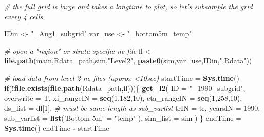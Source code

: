 \documentclass[
]{article}
\newenvironment{Shaded}{\begin{snugshade}}{\end{snugshade}}
\newcommand{\CommentTok}[1]{\textcolor[rgb]{0.56,0.35,0.01}{\textit{#1}}}
\newcommand{\ControlFlowTok}[1]{\textcolor[rgb]{0.13,0.29,0.53}{\textbf{#1}}}
\newcommand{\DataTypeTok}[1]{\textcolor[rgb]{0.13,0.29,0.53}{#1}}
\newcommand{\DecValTok}[1]{\textcolor[rgb]{0.00,0.00,0.81}{#1}}
\newcommand{\KeywordTok}[1]{\textcolor[rgb]{0.13,0.29,0.53}{\textbf{#1}}}
\newcommand{\NormalTok}[1]{#1}
\newcommand{\OperatorTok}[1]{\textcolor[rgb]{0.81,0.36,0.00}{\textbf{#1}}}
\newcommand{\StringTok}[1]{\textcolor[rgb]{0.31,0.60,0.02}{#1}}
\begin{document}
\begin{Shaded}
\begin{Highlighting}[]
    \CommentTok{# the full grid is large and takes a longtime to plot, so let's subsample the grid every 4 cells}
   
\NormalTok{    IDin       <-}\StringTok{ "_Aug1_subgrid"}
\NormalTok{    var_use    <-}\StringTok{ "_bottom5m_temp"}
    
    \CommentTok{# open a "region" or strata specific nc file}
\NormalTok{    fl         <-}\StringTok{ }\KeywordTok{file.path}\NormalTok{(main,Rdata_path,sim,}\StringTok{"Level2"}\NormalTok{,}
                            \KeywordTok{paste0}\NormalTok{(sim,var_use,IDin,}\StringTok{".Rdata"}\NormalTok{))}
    
   \CommentTok{# load data from level 2 nc files (approx <10sec)}
\NormalTok{    startTime =}\StringTok{ }\KeywordTok{Sys.time}\NormalTok{()}
    \ControlFlowTok{if}\NormalTok{(}\OperatorTok{!}\KeywordTok{file.exists}\NormalTok{(}\KeywordTok{file.path}\NormalTok{(Rdata_path,fl)))\{}
      \KeywordTok{get_l2}\NormalTok{(}
        \DataTypeTok{ID          =} \StringTok{"_1990_subgrid"}\NormalTok{,}
        \DataTypeTok{overwrite   =}\NormalTok{ T,}
        \DataTypeTok{xi_rangeIN  =} \KeywordTok{seq}\NormalTok{(}\DecValTok{1}\NormalTok{,}\DecValTok{182}\NormalTok{,}\DecValTok{10}\NormalTok{),}
        \DataTypeTok{eta_rangeIN =} \KeywordTok{seq}\NormalTok{(}\DecValTok{1}\NormalTok{,}\DecValTok{258}\NormalTok{,}\DecValTok{10}\NormalTok{),}
        \DataTypeTok{ds_list     =}\NormalTok{ dl[}\DecValTok{1}\NormalTok{],  }\CommentTok{# must be same length as sub_varlist}
        \DataTypeTok{trIN        =}\NormalTok{ tr,}
        \DataTypeTok{yearsIN     =} \DecValTok{1990}\NormalTok{,}
        \DataTypeTok{sub_varlist =} \KeywordTok{list}\NormalTok{(}\StringTok{'Bottom 5m'}\NormalTok{ =}\StringTok{ "temp"}\NormalTok{ ),  }
        \DataTypeTok{sim_list    =}\NormalTok{ sim  )}
\NormalTok{    \}}
\NormalTok{    endTime  =}\StringTok{ }\KeywordTok{Sys.time}\NormalTok{()}
\NormalTok{    endTime  }\OperatorTok{-}\StringTok{ }\NormalTok{startTime}
    

\end{Highlighting}
\end{Shaded}
\end{document}
